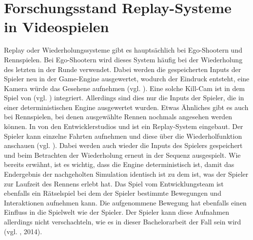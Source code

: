 \section{Forschungsstand Replay-Systeme in Videospielen}
Replay oder Wiederholungssysteme gibt es hauptsächlich bei Ego-Shootern und Rennspielen. Bei Ego-Shootern wird dieses System häufig bei der Wiederholung des letzten  in der Runde verwendet. Dabei werden die gespeicherten Inputs der Spieler neu in der Game-Engine ausgewertet, wodurch der Eindruck entsteht, eine Kamera würde das Gesehene aufnehmen (vgl. \cite{noauthor_new_nodate}). Eine solche Kill-Cam ist in dem Spiel  von  (vgl. \cite{noauthor_call_nodate}) integriert. Allerdings sind dies nur die Inputs der Spieler, die in einer deterministischen Engine ausgewertet wurden. Etwas Ähnliches gibt es auch bei Rennspielen, bei denen ausgewählte Rennen nochmals angesehen werden können. In  von den Entwicklerstudios  und  ist ein Replay-System eingebaut. Der Spieler kann einzelne Fahrten aufnehmen und diese über die Wiederholfunktion anschauen (vgl. \cite{noauthor_forza_nodate}). Dabei werden auch wieder die Inputs des Spielers gespeichert und beim Betrachten der Wiederholung erneut in der Sequenz ausgespielt. Wie bereits erwähnt, ist es wichtig, dass die Engine deterministisch ist, damit das Endergebnis der nachgeholten Simulation identisch ist zu dem ist, was der Spieler zur Laufzeit des Rennens erlebt hat. 
Das Spiel  vom Entwicklungsteam  ist ebenfalls ein Rätselspiel bei dem der Spieler bestimmte Bewegungen und Interaktionen aufnehmen kann. Die aufgenommene Bewegung hat ebenfalls einen Einfluss in die Spielwelt wie der Spieler. Der Spieler kann diese Aufnahmen allerdings nicht verschachteln, wie es in dieser Bachelorarbeit der Fall sein wird (vgl. \cite{croteam_talos_2014}, 2014).

